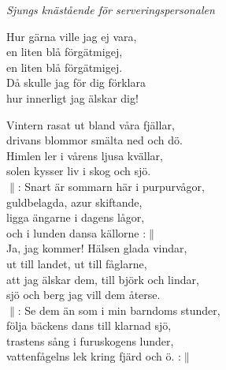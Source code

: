 \documentclass[a6paper, 10pt, twoside]{article}
\begin{document}
\noindent
\begin{center}
\small{\textit{Sjungs knästående för serveringspersonalen}}
\end{center}
\begin{lyrics}
Hur gärna ville jag ej vara,\\
en liten blå förgätmigej,\\
en liten blå förgätmigej.\\
Då skulle jag för dig förklara\\
hur innerligt jag älskar dig!
\end{lyrics}
\vspace{30pt}
\begin{center}
\end{center}
\begin{lyrics}
Vintern rasat ut bland våra fjällar,\\
drivans blommor smälta ned och dö.\\
Himlen ler i vårens ljusa kvällar,\\
solen kysser liv i skog och sjö.
\vspace{5pt}\\
$\|$: Snart är sommarn här i purpurvågor,\\
guldbelagda, azur skiftande,\\
ligga ängarne i dagens lågor,\\
och i lunden dansa källorne :$\|$
\vspace{5pt}\\
Ja, jag kommer! Hälsen glada vindar,\\
ut till landet, ut till fåglarne,\\
att jag älskar dem, till björk och lindar,\\
sjö och berg jag vill dem återse.
\vspace{5pt}\\
$\|$: Se dem än som i min barndoms stunder,\\
följa bäckens dans till klarnad sjö,\\
trastens sång i furuskogens lunder,\\
vattenfågelns lek kring fjärd och ö. :$\|$
\end{lyrics}
\end{document}
